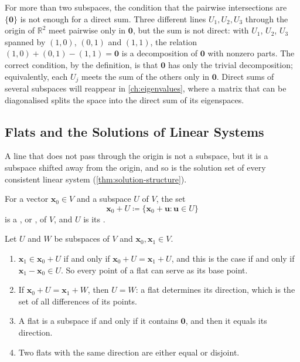 For more than two subspaces, the condition that the pairwise intersections are $\{\mathbf 0\}$ is not enough for a direct sum. Three different lines $U_1,U_2,U_3$ through the origin of $\mathbb R^2$ meet pairwise only in $\mathbf 0$, but the sum is not direct: with $U_1$, $U_2$, $U_3$ spanned by $(1,0)$, $(0,1)$ and $(1,1)$, the relation $(1,0)+(0,1)-(1,1)=\mathbf 0$ is a decomposition of $\mathbf 0$ with nonzero parts. The correct condition, by the definition, is that $\mathbf 0$ has only the trivial decomposition; equivalently, each $U_j$ meets the sum of the others only in $\mathbf 0$. Direct sums of several subspaces will reappear in \cref{ch:eigenvalues}, where a matrix that can be diagonalised splits the space into the direct sum of its eigenspaces.

\subsection{Flats and the Solutions of Linear Systems}

A line that does not pass through the origin is not a subspace, but it is a subspace shifted away from the origin, and so is the solution set of every consistent linear system (\cref{thm:solution-structure}).

\begin{definition}[Flat]
\label{def:flat}
For a vector $\mathbf x_0\in V$ and a subspace $U$ of $V$, the set
\[
\mathbf x_0+U\coloneqq\{\mathbf x_0+\mathbf u: \mathbf u\in U\}
\]
is a , or , of $V$, and $U$ is its .
\end{definition}

\begin{proposition}[Flats]
\label{prop:flats}
Let $U$ and $W$ be subspaces of $V$ and $\mathbf x_0,\mathbf x_1\in V$.
\begin{enumerate}
\item $\mathbf x_1\in\mathbf x_0+U$ if and only if $\mathbf x_0+U=\mathbf x_1+U$, and this is the case if and only if $\mathbf x_1-\mathbf x_0\in U$. So every point of a flat can serve as its base point.
\item If $\mathbf x_0+U=\mathbf x_1+W$, then $U=W$: a flat determines its direction, which is the set of all differences of its points.
\item A flat is a subspace if and only if it contains $\mathbf 0$, and then it equals its direction.
\item Two flats with the same direction are either equal or disjoint.
\end{enumerate}
\end{proposition}

